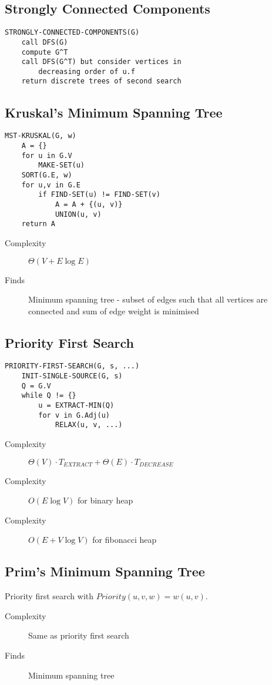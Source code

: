 \documentclass[landscape]{cheat}
\begin{document}
\begin{multicols*}{3}
\subsection{Strongly Connected Components}
\begin{lstlisting}
STRONGLY-CONNECTED-COMPONENTS(G)
    call DFS(G)
    compute G^T
    call DFS(G^T) but consider vertices in
        decreasing order of u.f
    return discrete trees of second search
\end{lstlisting}

\subsection{Kruskal's Minimum Spanning Tree}
\begin{lstlisting}
MST-KRUSKAL(G, w)
    A = {}
    for u in G.V
        MAKE-SET(u)
    SORT(G.E, w)
    for u,v in G.E
        if FIND-SET(u) != FIND-SET(v)
            A = A + {(u, v)}
            UNION(u, v)
    return A
\end{lstlisting}
\begin{description}
    \item[Complexity] $\Theta(V+E\log{E})$
    \item[Finds] Minimum spanning tree - subset of edges such that all vertices are connected and sum of edge weight is minimised
\end{description}

\subsection{Priority First Search}
\begin{lstlisting}
PRIORITY-FIRST-SEARCH(G, s, ...)
    INIT-SINGLE-SOURCE(G, s)
    Q = G.V
    while Q != {}
        u = EXTRACT-MIN(Q)
        for v in G.Adj(u)
            RELAX(u, v, ...)
\end{lstlisting}
\begin{description}
    \item[Complexity] $\Theta(V)\cdot T_{EXTRACT} + \Theta(E)\cdot T_{DECREASE}$
    \item[Complexity] $O(E\log{V})$ for binary heap
    \item[Complexity] $O(E+V\log{V})$ for fibonacci heap
\end{description}

\subsection{Prim's Minimum Spanning Tree}
Priority first search with $Priority(u, v, w) = w(u, v)$.
\begin{description}
    \item[Complexity] Same as priority first search
    \item[Finds] Minimum spanning tree
\end{description}


\end{multicols*}
\end{document}
